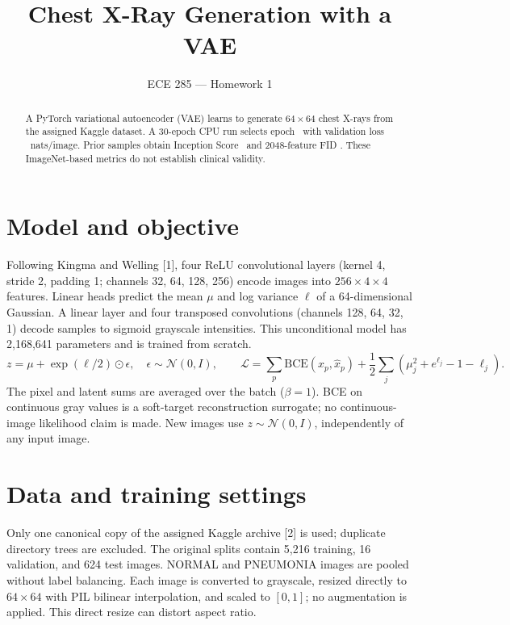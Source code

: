 \documentclass{article}
\title{Chest X-Ray Generation with a VAE}
\author{ECE 285 --- Homework 1}
\begin{document}
\maketitle
\begin{abstract}
A PyTorch variational autoencoder (VAE) learns to generate $64\times64$ chest X-rays from the assigned Kaggle dataset. A 30-epoch CPU run selects epoch \BestEpoch\ with validation loss \BestVal\ nats/image. Prior samples obtain Inception Score \ISValue\ and 2048-feature FID \FIDValue. These ImageNet-based metrics do not establish clinical validity.
\end{abstract}

\section{Model and objective}
Following Kingma and Welling [1], four ReLU convolutional layers (kernel 4, stride 2, padding 1; channels 32, 64, 128, 256) encode images into $256\times4\times4$ features. Linear heads predict the mean $\mu$ and log variance $\ell$ of a 64-dimensional Gaussian. A linear layer and four transposed convolutions (channels 128, 64, 32, 1) decode samples to sigmoid grayscale intensities. This unconditional model has 2,168,641 parameters and is trained from scratch.
\begin{equation}
 z=\mu+\exp(\ell/2)\odot\epsilon,\quad \epsilon\sim\mathcal{N}(0,I),\qquad
 \mathcal{L}=\sum_{p}\mathrm{BCE}(x_p,\hat{x}_p)
 +\frac12\sum_j(\mu_j^2+e^{\ell_j}-1-\ell_j).
\end{equation}
The pixel and latent sums are averaged over the batch ($\beta=1$). BCE on continuous gray values is a soft-target reconstruction surrogate; no continuous-image likelihood claim is made. New images use $z\sim\mathcal{N}(0,I)$, independently of any input image.

\section{Data and training settings}
Only one canonical copy of the assigned Kaggle archive [2] is used; duplicate directory trees are excluded. The original splits contain 5,216 training, 16 validation, and 624 test images. NORMAL and PNEUMONIA images are pooled without label balancing. Each image is converted to grayscale, resized directly to $64\times64$ with PIL bilinear interpolation, and scaled to $[0,1]$; no augmentation is applied. This direct resize can distort aspect ratio.
\end{document}
